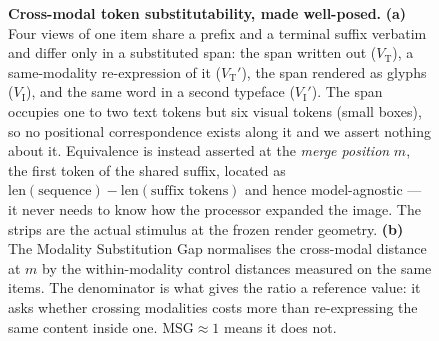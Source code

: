 \begin{figure}[t]
\begin{tikzpicture}
\end{tikzpicture}
\caption{\textbf{Cross-modal token substitutability, made well-posed.}
\textbf{(a)} Four views of one item share a prefix and a terminal suffix
verbatim and differ only in a substituted span: the span written out
($V_\mathrm{T}$), a same-modality re-expression of it ($V_\mathrm{T}'$), the
span rendered as glyphs ($V_\mathrm{I}$), and the same word in a second
typeface ($V_\mathrm{I}'$). The span occupies one to two text tokens but six
visual tokens (small boxes), so no positional correspondence exists along it
and we assert nothing about it. Equivalence is instead asserted at the
\emph{merge position} $m$, the first token of the shared suffix, located as
$\mathrm{len}(\text{sequence})-\mathrm{len}(\text{suffix tokens})$ and hence
model-agnostic --- it never needs to know how the processor expanded the image.
The strips are the actual stimulus at the frozen render geometry.
\textbf{(b)} The Modality Substitution Gap normalises the cross-modal distance
at $m$ by the within-modality control distances measured on the same items.
The denominator is what gives the ratio a reference value: it asks whether
crossing modalities costs more than re-expressing the same content inside one.
$\mathrm{MSG}\approx1$ means it does not.}
\label{fig:method}
\end{figure}

